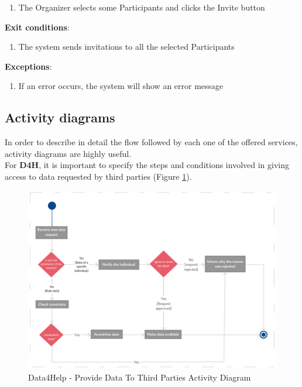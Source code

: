 \documentclass[a4paper, hidelinks, 12pt]{report}
\begin{document}
\begin{itemize}
\begin{enumerate}
			\item{The Organizer selects some Participants and clicks the Invite button}
		\end{enumerate}
		\textbf{Exit conditions}:
		\begin{enumerate}
			\item{The system sends invitations to all the selected Participants}
		\end{enumerate}
		\textbf{Exceptions}:
		\begin{enumerate}
			\item{If an error occurs, the system will show an error message}
		\end{enumerate}
		\end{itemize}
	
	\subsection{Activity diagrams}
	In order to describe in detail the flow followed by each one of the offered services, activity diagrams are highly useful. \\
	
	 For \textbf{D4H}, it is important to specify the steps and conditions involved in giving access to data requested by third parties (Figure \ref{fig:d4h_act_provide_data}).\\
	
	\begin{figure}[H]
		\centering
		\includegraphics[scale=0.6]{Diagrams/d4h_activity_diagram.png}
		\caption[Data4Help - Provide Data To Third Parties Activity Diagram]{Data4Help - Provide Data To Third Parties Activity Diagram}
		\label{fig:d4h_act_provide_data}
	\end{figure}
	
\end{document}
